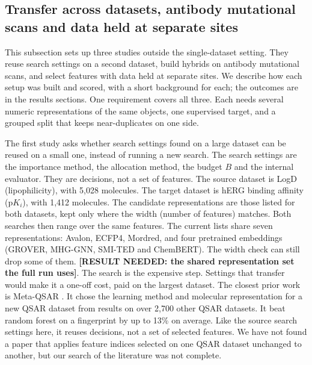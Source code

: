 \subsection{Transfer across datasets, antibody mutational scans and data held at separate sites}

This subsection sets up three studies outside the single-dataset setting. They reuse search settings on a second dataset, build hybrids on antibody mutational scans, and select features with data held at separate sites. We describe how each setup was built and scored, with a short background for each; the outcomes are in the results sections. One requirement covers all three. Each needs several numeric representations of the same objects, one supervised target, and a grouped split that keeps near-duplicates on one side.

The first study asks whether search settings found on a large dataset can be reused on a small one, instead of running a new search. The search settings are the importance method, the allocation method, the budget $B$ and the internal evaluator. They are decisions, not a set of features. The source dataset is LogD (lipophilicity), with 5,028 molecules. The target dataset is hERG binding affinity ($\mathrm{p}K_i$), with 1,412 molecules. The candidate representations are those listed for both datasets, kept only where the width (number of features) matches. Both searches then range over the same features. The current lists share seven representations: Avalon, ECFP4, Mordred, and four pretrained embeddings (GROVER, MHG-GNN, SMI-TED and ChemBERT). The width check can still drop some of them. \textbf{[RESULT NEEDED: the shared representation set the full run uses]}. The search is the expensive step. Settings that transfer would make it a one-off cost, paid on the largest dataset. The closest prior work is Meta-QSAR \citep{Olier2018}. It chose the learning method and molecular representation for a new QSAR dataset from results on over 2,700 other QSAR datasets. It beat random forest on a fingerprint by up to 13\% on average. Like the source search settings here, it reuses decisions, not a set of selected features. We have not found a paper that applies feature indices selected on one QSAR dataset unchanged to another, but our search of the literature was not complete.

